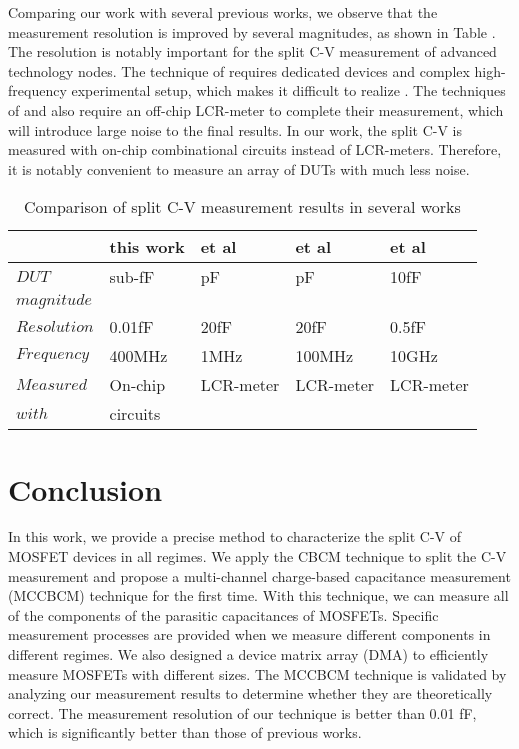 \documentclass[journal]{IEEEtran}
\begin{document}
Comparing our work with several previous works, we observe that the measurement resolution is improved by several magnitudes, as shown in Table \uppercase\expandafter{}. The resolution is notably important for the split C-V measurement of advanced technology nodes. The technique of \cite{5} requires dedicated devices and complex high-frequency experimental setup, which makes it difficult to realize \cite{4}. The techniques of \cite{2} and \cite{3} also require an off-chip LCR-meter to complete their measurement, which will introduce large noise to the final results. In our work, the split C-V is measured with on-chip combinational circuits instead of LCR-meters. Therefore, it is notably convenient to measure an array of DUTs with much less noise.  



\begin{table}[h]
\caption{Comparison of split C-V measurement results in several works}
{\begin{tabular}{|p{1.5cm}<{\centering}|p{1.3cm}<{\centering}|p{1.3cm}<{\centering}|p{1.3cm}<{\centering}|p{1.3cm}<{\centering}|}
\hline
 &this work&et al\cite{2}&et al\cite{3}&et al\cite{5}\\
\hline
$DUT$ & sub-fF &pF& pF & 10fF \\
$magnitude$ &&&&\\
\hline
$Resolution$ & 0.01fF &20fF& 20fF & 0.5fF\\
\hline
$Frequency$ & 400MHz &1MHz& 100MHz & 10GHz\\
\hline
$Measured$  &On-chip&LCR-meter&LCR-meter&LCR-meter  \\
$with$      &circuits&&&  \\
\hline

\end{tabular}}{}
\end{table}








\section{Conclusion}

In this work, we provide a precise method to characterize the split C-V of MOSFET devices in all regimes. We apply the CBCM technique to split the C-V measurement and propose a multi-channel charge-based capacitance measurement (MCCBCM) technique for the first time. With this technique, we can measure all of the components of the parasitic capacitances of MOSFETs. Specific measurement processes are provided when we measure different components in different regimes. We also designed a device matrix array (DMA) to efficiently measure MOSFETs with different sizes. The MCCBCM technique is validated by analyzing our measurement results to determine whether they are theoretically correct. The measurement resolution of our technique is better than 0.01 fF, which is significantly better than those of previous works.  
\end{document}
